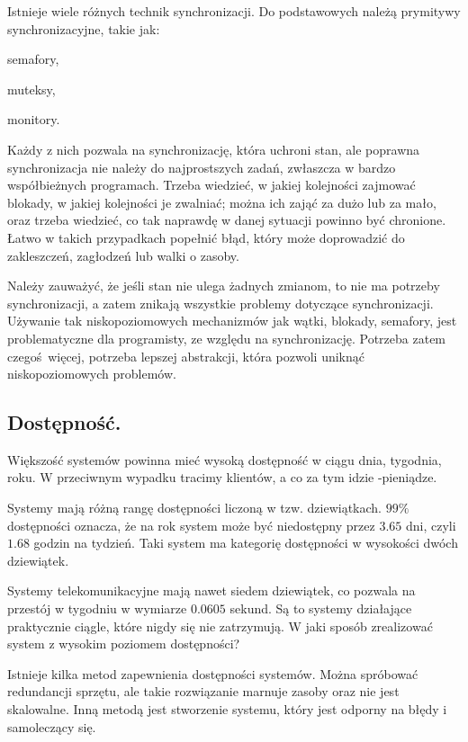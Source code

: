 \documentclass[oneside, 11pt, a4paper]{article}
\begin{document}
\begin{multicols}{2}
Istnieje wiele różnych technik synchronizacji. Do podstawowych należą prymitywy synchronizacyjne, takie jak:
\begin{compactitem}
\item semafory,
\item muteksy,
\item monitory.
\end{compactitem}
Każdy z nich pozwala na synchronizację, która uchroni stan, ale poprawna synchronizacja nie należy do najprostszych zadań, zwłaszcza w bardzo współbieżnych programach. Trzeba wiedzieć, w jakiej kolejności zajmować blokady, w jakiej kolejności je zwalniać; można ich zająć za dużo lub za mało, oraz trzeba wiedzieć, co tak naprawdę w danej sytuacji powinno być chronione. Łatwo w takich przypadkach popełnić błąd, który może doprowadzić do zakleszczeń, zagłodzeń lub walki o zasoby. 

Należy zauważyć, że jeśli stan nie ulega żadnych zmianom, to nie ma potrzeby synchronizacji, a zatem znikają wszystkie problemy dotyczące synchronizacji. Używanie tak niskopoziomowych mechanizmów jak wątki, blokady, semafory, jest problematyczne dla programisty, ze względu na synchronizację. Potrzeba zatem czegoś więcej, potrzeba lepszej abstrakcji, która pozwoli uniknąć niskopoziomowych problemów.

\subsection{Dostępność.}

Większość systemów powinna mieć wysoką dostępność w ciągu dnia, tygodnia, roku. W przeciwnym wypadku tracimy klientów, a co za tym idzie -pieniądze. 

Systemy mają różną rangę dostępności liczoną w tzw. dziewiątkach. $99\%$ dostępności oznacza, że na rok system może być niedostępny przez $3.65$ dni, czyli $1.68$ godzin na tydzień. Taki system ma kategorię dostępności w wysokości dwóch dziewiątek. 

Systemy telekomunikacyjne mają nawet siedem dziewiątek, co pozwala na przestój w tygodniu w wymiarze $0.0605$ sekund. Są to systemy działające praktycznie ciągle, które nigdy się nie zatrzymują. W jaki sposób zrealizować system z wysokim poziomem dostępności?

Istnieje kilka metod zapewnienia dostępności systemów. Można spróbować redundancji sprzętu, ale takie rozwiązanie marnuje zasoby oraz nie jest skalowalne. Inną metodą jest stworzenie systemu, który jest odporny na błędy i samoleczący się.


\end{multicols}
\end{document}
